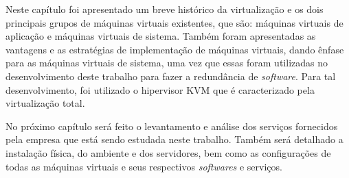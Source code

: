 Neste capítulo foi apresentado um breve histórico da virtualização e os dois principais grupos de máquinas virtuais existentes, que são: máquinas 
virtuais de aplicação e máquinas virtuais de sistema. Também foram apresentadas as vantagens e as estratégias de implementação de máquinas virtuais, 
dando ênfase para as máquinas virtuais de sistema, uma vez que essas foram utilizadas no desenvolvimento deste trabalho para fazer a redundância 
de \textit{software}. Para tal desenvolvimento, foi utilizado o hipervisor \ac{KVM} que é caracterizado pela virtualização total.

No próximo capítulo será feito o levantamento e análise dos serviços fornecidos pela empresa que está sendo estudada neste trabalho.
Também será detalhado a instalação física, do ambiente e dos servidores, bem como as configurações de todas as máquinas virtuais e seus
respectivos \textit{softwares} e serviços.
